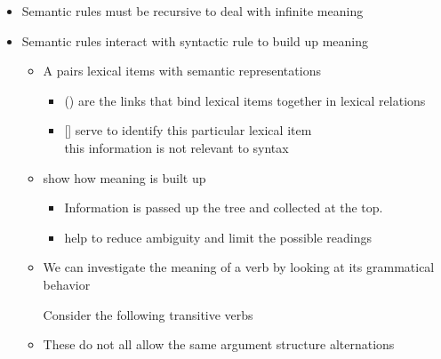 \documentclass[headrule,footrule]{foils}
\begin{document}

\begin{itemize}
\item Semantic rules must be recursive to deal with infinite meaning
\item Semantic rules interact with syntactic rule to build up meaning 
  \begin{itemize}
  \item A  pairs lexical items with semantic representations
 \begin{itemize}
 \item () are the links that bind lexical items
   together in lexical relations
 \item {[]} serve to identify this particular lexical item
   \\ this information is not relevant to syntax
 \end{itemize}
\item{} show how meaning is built up
  \begin{itemize}
  \item Information is passed up the tree and collected at the top.
  \item {} help to reduce ambiguity and
    limit the possible readings
  \end{itemize}
\end{itemize}

  

\begin{itemize}
\item We can investigate the meaning of a verb by looking at its
  grammatical behavior
  \begin{exe}
    \ex Consider the following transitive verbs
    \begin{xlist}
      \ex {}
      \ex {}
      \ex {}
      \ex {}
    \end{xlist}
  \end{exe}
\item These do not all allow the same argument structure alternations

\end{itemize}


\end{itemize}
\end{document}
